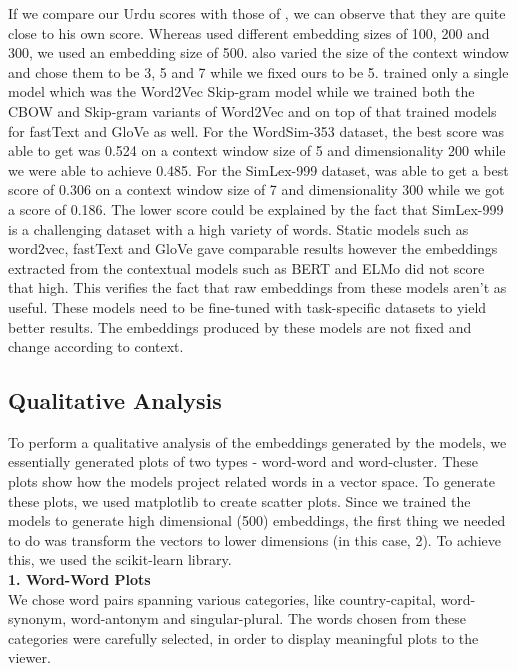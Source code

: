 \documentclass[format=acmsmall,review=true,screen=true]{acmart}
\begin{document}
    If we compare our Urdu scores with those of \cite{haider2018urdu}, we can observe that they are quite close to his own score. Whereas \cite{haider2018urdu} used different embedding sizes of 100, 200 and 300, we used an embedding size of 500. \cite{haider2018urdu} also varied the size of the context window and chose them to be 3, 5 and 7 while we fixed ours to be 5. \cite{haider2018urdu} trained only a single model which was the Word2Vec Skip-gram model while we trained both the CBOW and Skip-gram variants of Word2Vec and on top of that trained models for fastText and GloVe as well. For the WordSim-353 dataset, the best score \cite{haider2018urdu} was able to get was 0.524 on a context window size of 5 and dimensionality 200 while we were able to achieve 0.485. For the SimLex-999 dataset, \cite{haider2018urdu} was able to get a best score of 0.306 on a context window size of 7 and dimensionality 300 while we got a score of 0.186. The lower score could be explained by the fact that SimLex-999 is a challenging dataset with a high variety of words. Static models such as word2vec, fastText and GloVe gave comparable results however the embeddings extracted from the contextual models such as BERT and ELMo did not score that high. This verifies the fact that raw embeddings from these models aren’t as useful. These models need to be fine-tuned with task-specific datasets to yield better results. The embeddings produced by these models are not fixed and change according to context.

    
    \subsection{Qualitative Analysis}
To perform a qualitative analysis of the embeddings generated by the models, we essentially generated plots of two types - word-word and word-cluster. These plots show how the models project related words in a vector space. To generate these plots, we used matplotlib to create scatter plots.
Since we trained the models to generate high dimensional (500) embeddings, the first thing we needed to do was transform the vectors to lower dimensions (in this case, 2). To achieve this, we used the scikit-learn library.\\

\textbf{1. Word-Word Plots}\\
We chose word pairs spanning various categories, like country-capital, word-synonym, word-antonym and singular-plural. The words chosen from these categories were carefully selected, in order to display meaningful plots to the viewer.\\
\end{document}
